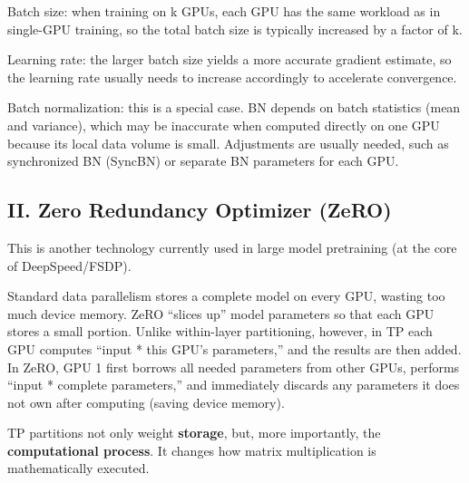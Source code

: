 Batch size: when training on k GPUs, each GPU has the same workload as in single-GPU training, so the total batch size is typically increased by a factor of k.

Learning rate: the larger batch size yields a more accurate gradient estimate, so the learning rate usually needs to increase accordingly to accelerate convergence.

Batch normalization: this is a special case. BN depends on batch statistics (mean and variance), which may be inaccurate when computed directly on one GPU because its local data volume is small. Adjustments are usually needed, such as synchronized BN (SyncBN) or separate BN parameters for each GPU.

\hypertarget{ii.-zero-redundancy-optimizer-zero}{%
\subsection{II. Zero Redundancy Optimizer (ZeRO)}\label{ii.-zero-redundancy-optimizer-zero}}

This is another technology currently used in large model pretraining (at the core of DeepSpeed/FSDP).

Standard data parallelism stores a complete model on every GPU, wasting too much device memory. ZeRO ``slices up'' model parameters so that each GPU stores a small portion. Unlike within-layer partitioning, however, in TP each GPU computes ``input * this GPU's parameters,'' and the results are then added. In ZeRO, GPU 1 first borrows all needed parameters from other GPUs, performs ``input * complete parameters,'' and immediately discards any parameters it does not own after computing (saving device memory).

TP partitions not only weight \textbf{storage}, but, more importantly, the \textbf{computational process}. It changes how matrix multiplication is mathematically executed.


